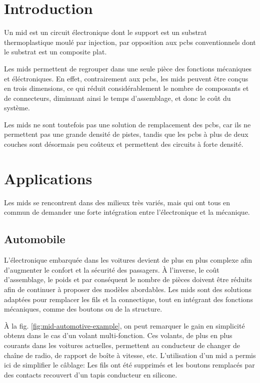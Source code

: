 \section{Introduction}
Un \gls{mid}  est un circuit électronique
dont le support est un substrat thermoplastique moulé par injection, par
opposition aux \glspl{pcb} conventionnels dont le substrat est un composite
plat.

Les \glspl{mid} permettent de regrouper dans une seule pièce des fonctions
mécaniques et éléctroniques. En effet, contrairement aux \glspl{pcb}, les
\glspl{mid} peuvent être conçus en trois dimensions, ce qui réduit
considérablement le nombre de composants et de connecteurs, diminuant ainsi le
temps d'assemblage, et donc le coût du système. 

Les \glspl{mid} ne sont toutefois pas une solution de remplacement des
\glspl{pcb}, car ils ne permettent pas une grande densité de pistes, tandis que
les \glspl{pcb} à plus de deux couches sont désormais peu coûteux et
permettent des circuits à forte densité.


\section{Applications}
Les \glspl{mid} se rencontrent dans des milieux très variés, mais qui ont tous en commun de demander une forte intégration entre l'électronique et la mécanique.

\subsection{Automobile}
L'électronique embarquée dans les voitures devient de plus en plus complexe afin d'augmenter le confort et la sécurité des passagers. 
À l'inverse, le coût d'assemblage, le poids et par conséquent le nombre de pièces doivent être réduits afin de continuer à proposer des modèles abordables.
Les \glspl{mid} sont des solutions adaptées pour remplacer les fils et la connectique, tout en intégrant des fonctions mécaniques, comme des boutons ou de la structure.

À la fig. \ref{fig:mid-automotive-example}, on peut remarquer le gain en simplicité obtenu dans le cas d'un volant multi-fonction.
Ces volants, de plus en plus courants dans les voitures actuelles, permettent au conducteur de changer de chaîne de radio, de rapport de boîte à vitesse, etc.
L'utilisation d'un \gls{mid} a permis ici de simplifier le câblage: Les fils ont été supprimés et les boutons remplacés par des contacts recouvert d'un tapis conducteur en silicone.

